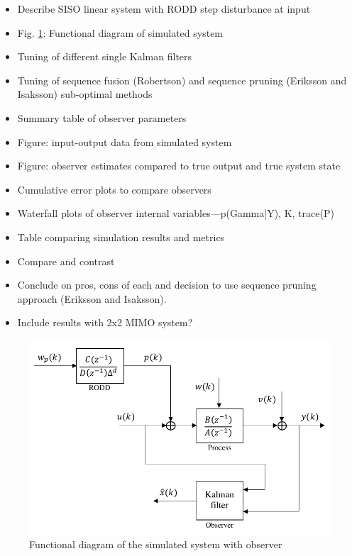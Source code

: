 \begin{itemize}
	\item Describe SISO linear system with RODD step disturbance at input
	\item Fig. \ref{fig:sim-sys-diag-siso}: Functional diagram of simulated system
	\item Tuning of different single Kalman filters
	\item Tuning of sequence fusion (Robertson) and sequence pruning (Eriksson and Isaksson) sub-optimal methods
	\item Summary table of observer parameters
	\item Figure: input-output data from simulated system
	\item Figure: observer estimates compared to true output and true system state
	\item Cumulative error plots to compare observers
	\item Waterfall plots of observer internal variables—p(Gamma|Y), K, trace(P)
	\item Table comparing simulation results and metrics
	\item Compare and contrast
	\item Conclude on pros, cons of each and decision to use sequence pruning approach (Eriksson and Isaksson).
\end{itemize}

\begin{itemize}
	\item Include results with 2x2 MIMO system?
\end{itemize}

\begin{figure}[htp]
	\centering
	\includegraphics[width=11.5cm]{images/sim-sys-diag-siso.pdf}
	\caption{Functional diagram of the simulated system with observer}
	\label{fig:sim-sys-diag-siso}
\end{figure}

